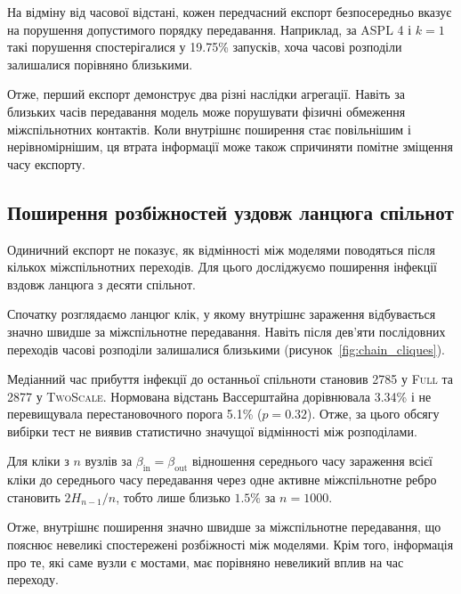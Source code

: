 \documentclass[a4paper,fleqn]{cas-sc}
\newcommand{\Full}{\textup{\textsc{Full}}}
\newcommand{\TS}{\textup{\textsc{TwoScale}}}
\begin{document}
На відміну від часової відстані,
кожен передчасний експорт безпосередньо
вказує на порушення допустимого порядку
передавання. Наприклад, за ASPL 4
і $k=1$ такі порушення спостерігалися
у 19.75\% запусків, хоча часові
розподіли залишалися порівняно близькими.

Отже, перший експорт демонструє
два різні наслідки агрегації.
Навіть за близьких часів передавання
модель може порушувати фізичні
обмеження міжспільнотних контактів.
Коли внутрішнє поширення стає повільнішим
і нерівномірнішим, ця втрата інформації
може також спричиняти помітне
зміщення часу експорту.


\subsection{Поширення розбіжностей
уздовж ланцюга спільнот}
\label{sec:res_chain_random}

Одиничний експорт не показує,
як відмінності між моделями поводяться
після кількох міжспільнотних переходів.
Для цього досліджуємо поширення інфекції
вздовж ланцюга з десяти спільнот.

Спочатку розглядаємо ланцюг клік,
у якому внутрішнє зараження відбувається
значно швидше за міжспільнотне передавання.
Навіть після дев'яти послідовних переходів
часові розподіли залишалися близькими
(рисунок~\ref{fig:chain_cliques}).

Медіанний час прибуття інфекції
до останньої спільноти становив
2785 у \Full{} та 2877 у \TS{}.
Нормована відстань Вассерштайна
дорівнювала 3.34\% і не перевищувала
перестановочного порога 5.1\%
($p=0.32$). Отже, за цього обсягу
вибірки тест не виявив статистично
значущої відмінності між розподілами.

Для кліки з $n$ вузлів за
$\beta_{\mathrm{in}}=\beta_{\mathrm{out}}$
відношення середнього часу зараження
всієї кліки до середнього часу
передавання через одне активне
міжспільнотне ребро становить
$2H_{n-1}/n$, тобто лише близько
$1.5\%$ за $n=1000$.

Отже, внутрішнє поширення значно
швидше за міжспільнотне передавання,
що пояснює невеликі спостережені
розбіжності між моделями. Крім того, інформація про те, які саме вузли є мостами, має порівняно невеликий вплив на час переходу.
\end{document}
